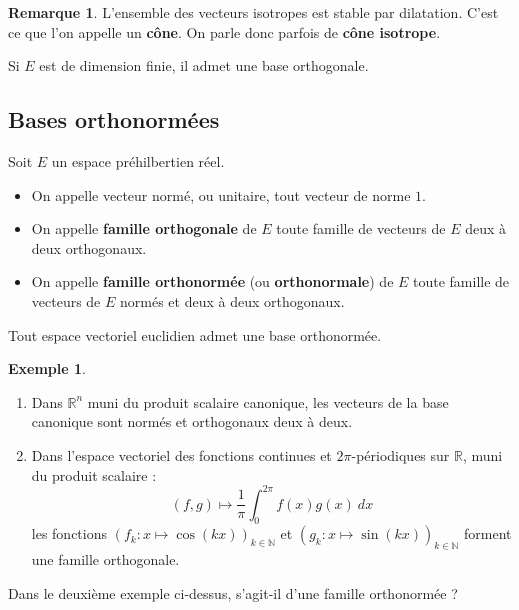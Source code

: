 \documentclass[french]{article}
\newcommand{\N}{\mathbb{N}}
\newcommand{\R}{\mathbb{R}}
\theoremstyle{plain}
\theoremstyle{definition}
\newtheorem*{ex}{Exemple}
\newtheorem*{rmq}{Remarque}
\theoremstyle{remark}
\begin{document}
\begin{rmq}
	L'ensemble des vecteurs isotropes est stable par dilatation. C'est ce que l'on appelle un \textbf{cône}. On parle donc parfois de \textbf{cône isotrope}.
\end{rmq}

\begin{thm}
	Si $E$ est de dimension finie, il admet une base orthogonale.
\end{thm}

\subsection{Bases orthonormées}

Soit $E$ un espace préhilbertien réel.

\begin{dfn}
	\begin{itemize}
		\item On appelle vecteur normé, ou unitaire, tout vecteur de norme $1$.
		\item On appelle \textbf{famille orthogonale} de $E$ toute famille de vecteurs de $E$ deux à deux orthogonaux.
		\item On appelle \textbf{famille orthonormée} (ou \textbf{orthonormale}) de $E$ toute famille de vecteurs de $E$ normés et deux à deux orthogonaux.
	\end{itemize}
\end{dfn}

\begin{prop}
	Tout espace vectoriel euclidien admet une base orthonormée.
\end{prop}

\begin{ex}
	\begin{enumerate}
		\item Dans $\R^n$ muni du produit scalaire canonique, les vecteurs de la base canonique sont normés et orthogonaux deux à deux.
		\item Dans l'espace vectoriel des fonctions continues et $2\pi$-périodiques sur $\R$, muni du produit scalaire : $$(f,g)\mapsto\frac{1}{\pi}\int_{0}^{2\pi}f(x)g(x)\ dx$$ les fonctions $(f_k:x\mapsto\cos(kx))_{k\in\N}$ et $(g_k:x\mapsto\sin(kx))_{k\in\N}$ forment une famille orthogonale.
	\end{enumerate}
\end{ex}

\begin{exo}
	Dans le deuxième exemple ci-dessus, s'agit-il d'une famille orthonormée ?
\end{exo}
\end{document}
